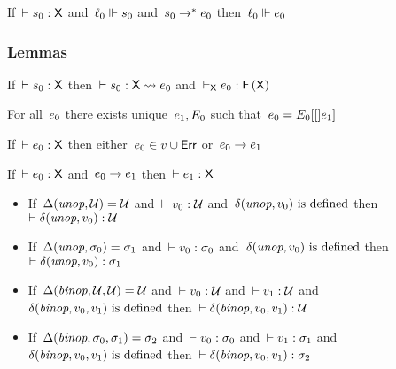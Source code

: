 \documentclass[nonacm,10pt]{acmart}
\begin{document}
\begin{theorem}
  If\ $\vdash s_0 : \mathsf{X}$
  and\ $\ell_0 \Vdash s_0$
  and\ $s_0 \rightarrow^{*} e_0$
  then\ $\ell_0 \Vdash e_0$
\end{theorem}


\subsubsection{Lemmas}

\begin{lemma}
  If\ $\vdash s_0 : \mathsf{X}$
  then\ $\vdash s_0 : \mathsf{X} \rightsquigarrow e_0$
  and\ $\vdash_{\mathsf{X}} e_0 : \mathsf{F}\,(\mathsf{X})$
\end{lemma}

\begin{lemma}[decomposition]
  For all\ $e_0$
  there exists unique\ $e_1, E_0$
  such that\ $e_0 = E_0[[]e_1]$
\end{lemma}

\begin{lemma}
  If\ $\vdash e_0 : \mathsf{X}$
  then either\ $e_0 \in v \cup \mathsf{Err}$
  or\ $e_0 \rightarrow e_1$
\end{lemma}

\begin{lemma}
  If\ $\vdash e_0 : \mathsf{X}$
  and\ $e_0 \rightarrow e_1$
  then\ $\vdash e_1 : \mathsf{X}$
\end{lemma}

\begin{lemma}\leavevmode
  \begin{itemize}
    \item
      If\ $\Delta(\textit{unop}, \mathcal{U}) = \mathcal{U}$
      and\ $\vdash v_0 : \mathcal{U}$
      and\ $\delta(\textit{unop}, v_0) \mbox{ is defined}$
      then\ $\vdash \delta(\textit{unop}, v_0) : \mathcal{U}$
    \item
      If\ $\Delta(\textit{unop}, \sigma_0) = \sigma_1$
      and\ $\vdash v_0 : \sigma_0$
      and\ $\delta(\textit{unop}, v_0) \mbox{ is defined}$
      then\ $\vdash \delta(\textit{unop}, v_0) : \sigma_1$
    \item
      If\ $\Delta(\textit{binop}, \mathcal{U}, \mathcal{U}) = \mathcal{U}$
      and\ $\vdash v_0 : \mathcal{U}$
      and\ $\vdash v_1 : \mathcal{U}$
      and\ $\delta(\textit{binop}, v_0, v_1) \mbox{ is defined}$
      then\ $\vdash \delta(\textit{binop}, v_0, v_1) : \mathcal{U}$
    \item
      If\ $\Delta(\textit{binop}, \sigma_0, \sigma_1) = \sigma_2$
      and\ $\vdash v_0 : \sigma_0$
      and\ $\vdash v_1 : \sigma_1$
      and\ $\delta(\textit{binop}, v_0, v_1) \mbox{ is defined}$
      then\ $\vdash \delta(\textit{binop}, v_0, v_1) : \sigma_2$
  \end{itemize}
\end{lemma}
\end{document}
